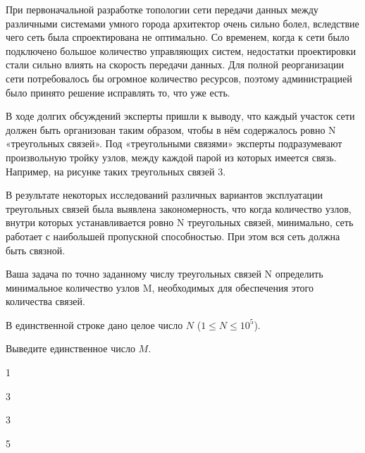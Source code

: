 
При первоначальной разработке топологии сети передачи данных между различными системами умного города архитектор очень сильно болел, вследствие чего сеть была спроектирована не оптимально. Со временем, когда к сети было подключено большое количество управляющих систем, недостатки проектировки стали сильно влиять на скорость передачи данных. Для полной реорганизации сети потребовалось бы огромное количество ресурсов, поэтому администрацией было принято решение исправлять то, что уже есть.

В ходе долгих обсуждений эксперты пришли к выводу, что каждый участок сети должен быть организован таким образом, чтобы в нём содержалось ровно N «треугольных связей». Под «треугольными связями» эксперты подразумевают произвольную тройку узлов, между каждой парой из которых имеется связь. Например, на рисунке таких треугольных связей 3.


В результате некоторых исследований различных вариантов эксплуатации треугольных связей была выявлена закономерность, что когда количество узлов, внутри которых устанавливается ровно N треугольных связей, минимально, сеть работает с наибольшей пропускной способностью. При этом вся сеть должна быть связной.

Ваша задача по точно заданному числу треугольных связей N определить минимальное количество узлов M, необходимых для обеспечения этого количества связей.


В единственной
строке дано целое число $ N $
($ 1 \le N \le 10^5 $).

\outputfmtSection

Выведите
единственное число $ M $.

\begin{myverbbox}[\small]{\vinput}
    1
\end{myverbbox}
\begin{myverbbox}[\small]{\voutput}
    3
\end{myverbbox}

\begin{myverbbox}[\small]{\vinput}
    3
\end{myverbbox}
\begin{myverbbox}[\small]{\voutput}
    5
\end{myverbbox}

